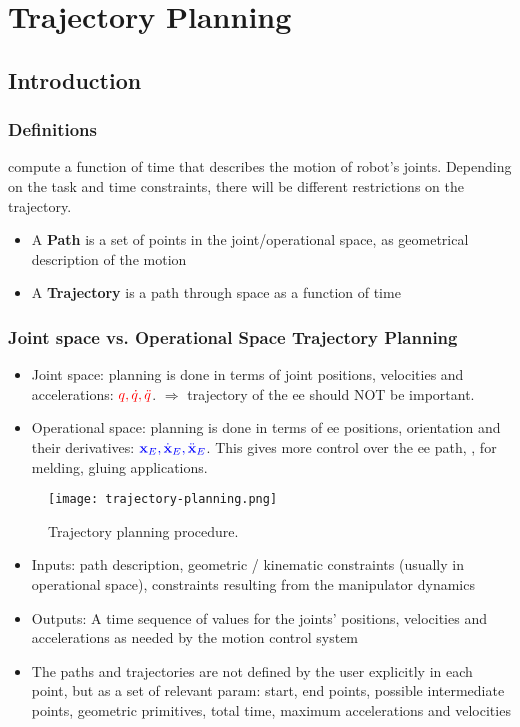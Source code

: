 \chapter{Trajectory Planning}

\section{Introduction}

\subsection{Definitions}
 compute a function of time that describes the motion of robot's joints. Depending on the task and time constraints, there will be different restrictions on the trajectory.
\begin{itemize}
	\item A {\color{blue} \textbf{Path}} is a set of points in the joint/operational space, as geometrical description of the motion
	\item A {\color{red} \textbf{Trajectory}} is a path through space as a function of time\\
	\textbf{{\color{red} }}
\end{itemize}

\subsection{Joint space vs. Operational Space Trajectory Planning}
\begin{itemize}
	\item Joint space: planning is done in terms of joint positions, velocities and accelerations: ${\color{red} q, \dot{q}, \ddot{q}}$. $\Rightarrow$ trajectory of the \ac{ee} should NOT be important.
	\item Operational space: planning is done in terms of \ac{ee} positions, orientation and their derivatives: ${\color{blue} \textbf{x}_E, \dot{\textbf{x}}_E, \ddot{\textbf{x}}_E}$. This gives more control over the \ac{ee} path, \eg, for melding, gluing applications.
\end{itemize}

\begin{figure}[hbt!]
	\centering
	\texttt{[image: trajectory-planning.png]}
	\caption{Trajectory planning procedure.}
	\label{fig:trajectory-planning}
\end{figure}
\begin{itemize}
	\item Inputs: path description, geometric / kinematic constraints (usually in operational space), constraints resulting from the manipulator dynamics
	\item Outputs: A time sequence of values for the joints' positions, velocities and accelerations as needed by the motion control system
	\item The paths and trajectories are not defined by the user explicitly in each point, but as a set of relevant \ac{param}: start, end points, possible intermediate points, geometric primitives, total time, maximum accelerations and velocities
\end{itemize}

